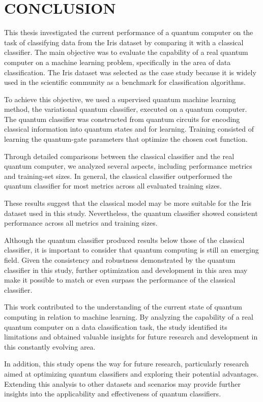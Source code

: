 \chapter{CONCLUSION}\label{chap_conclusao}

This thesis investigated the current performance of a quantum computer on the task of classifying data from the Iris dataset by comparing it with a classical classifier. The main objective was to evaluate the capability of a real quantum computer on a machine learning problem, specifically in the area of data classification. The Iris dataset was selected as the case study because it is widely used in the scientific community as a benchmark for classification algorithms.

To achieve this objective, we used a supervised quantum machine learning method, the variational quantum classifier, executed on a quantum computer. The quantum classifier was constructed from quantum circuits for encoding classical information into quantum states and for learning. Training consisted of learning the quantum-gate parameters that optimize the chosen cost function.

Through detailed comparisons between the classical classifier and the real quantum computer, we analyzed several aspects, including performance metrics and training-set sizes. In general, the classical classifier outperformed the quantum classifier for most metrics across all evaluated training sizes.

These results suggest that the classical model may be more suitable for the Iris dataset used in this study. Nevertheless, the quantum classifier showed consistent performance across all metrics and training sizes.

Although the quantum classifier produced results below those of the classical classifier, it is important to consider that quantum computing is still an emerging field. Given the consistency and robustness demonstrated by the quantum classifier in this study, further optimization and development in this area may make it possible to match or even surpass the performance of the classical classifier.

This work contributed to the understanding of the current state of quantum computing in relation to machine learning. By analyzing the capability of a real quantum computer on a data classification task, the study identified its limitations and obtained valuable insights for future research and development in this constantly evolving area.

In addition, this study opens the way for future research, particularly research aimed at optimizing quantum classifiers and exploring their potential advantages. Extending this analysis to other datasets and scenarios may provide further insights into the applicability and effectiveness of quantum classifiers.